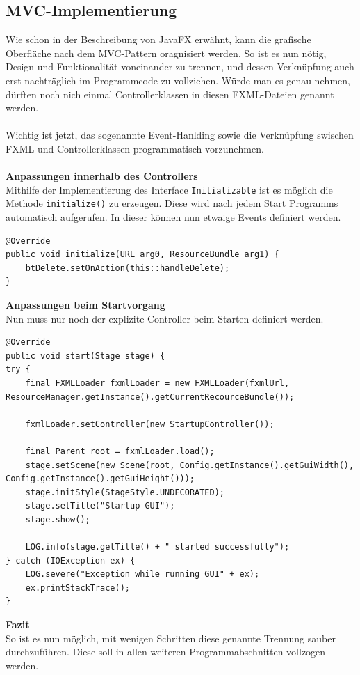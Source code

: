 \subsection{MVC-Implementierung}\label{subsec:mvc}
Wie schon in der Beschreibung von JavaFX erwähnt, kann die grafische Oberfläche nach dem MVC-Pattern oragnisiert werden.
So ist es nun nötig, Design und Funktionalität voneinander zu trennen, und dessen Verknüpfung auch erst nachträglich im Programmcode zu vollziehen.
Würde man es genau nehmen, dürften noch nich einmal Controllerklassen in diesen FXML-Dateien genannt werden.\\\\
Wichtig ist jetzt, das sogenannte Event-Hanlding sowie die Verknüpfung swischen FXML und Controllerklassen programmatisch vorzunehmen.\\\\
\textbf{Anpassungen innerhalb des Controllers}\\
Mithilfe der Implementierung des Interface \lstinline[style=java]{Initializable} ist es möglich die Methode \lstinline[style=java]{initialize()} zu erzeugen.
Diese wird nach jedem Start Programms automatisch aufgerufen.
In dieser können nun etwaige Events definiert werden.
\begin{lstlisting}[style=java,caption=Java-Codebeispiel,label=loggerOutput]
@Override
public void initialize(URL arg0, ResourceBundle arg1) {
    btDelete.setOnAction(this::handleDelete);
}
\end{lstlisting}
\textbf{Anpassungen beim Startvorgang}\\
Nun muss nur noch der explizite Controller beim Starten definiert werden.
\begin{lstlisting}[style=java,caption=Java-Codebeispiel,label=loggerOutput]
@Override
public void start(Stage stage) {
try {
    final FXMLLoader fxmlLoader = new FXMLLoader(fxmlUrl, ResourceManager.getInstance().getCurrentRecourceBundle());

    fxmlLoader.setController(new StartupController());

    final Parent root = fxmlLoader.load();
    stage.setScene(new Scene(root, Config.getInstance().getGuiWidth(), Config.getInstance().getGuiHeight()));
    stage.initStyle(StageStyle.UNDECORATED);
    stage.setTitle("Startup GUI");
    stage.show();

    LOG.info(stage.getTitle() + " started successfully");
} catch (IOException ex) {
    LOG.severe("Exception while running GUI" + ex);
    ex.printStackTrace();
}
\end{lstlisting}
\textbf{Fazit}\\
So ist es nun möglich, mit wenigen Schritten diese genannte Trennung sauber durchzuführen.
Diese soll in allen weiteren Programmabschnitten vollzogen werden.

